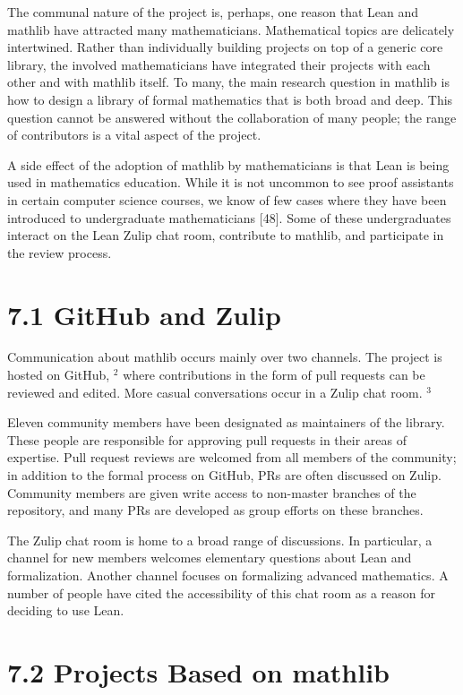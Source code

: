 \documentclass[
]{article}
\begin{document}
The communal nature of the project is, perhaps, one reason that Lean and
mathlib have attracted many mathematicians. Mathematical topics are
delicately intertwined. Rather than individually building projects on
top of a generic core library, the involved mathematicians have
integrated their projects with each other and with mathlib itself. To
many, the main research question in mathlib is how to design a library
of formal mathematics that is both broad and deep. This question cannot
be answered without the collaboration of many people; the range of
contributors is a vital aspect of the project.

A side effect of the adoption of mathlib by mathematicians is that Lean
is being used in mathematics education. While it is not uncommon to see
proof assistants in certain computer science courses, we know of few
cases where they have been introduced to undergraduate mathematicians
{[}48{]}. Some of these undergraduates interact on the Lean Zulip chat
room, contribute to mathlib, and participate in the review process.

\section{7.1 GitHub and Zulip}\label{github-and-zulip}

Communication about mathlib occurs mainly over two channels. The project
is hosted on GitHub, \(^{2}\) where contributions in the form of pull
requests can be reviewed and edited. More casual conversations occur in
a Zulip chat room. \(^{3}\)

Eleven community members have been designated as maintainers of the
library. These people are responsible for approving pull requests in
their areas of expertise. Pull request reviews are welcomed from all
members of the community; in addition to the formal process on GitHub,
PRs are often discussed on Zulip. Community members are given write
access to non-master branches of the repository, and many PRs are
developed as group efforts on these branches.

The Zulip chat room is home to a broad range of discussions. In
particular, a channel for new members welcomes elementary questions
about Lean and formalization. Another channel focuses on formalizing
advanced mathematics. A number of people have cited the accessibility of
this chat room as a reason for deciding to use Lean.

\section{7.2 Projects Based on mathlib}\label{projects-based-on-mathlib}
\end{document}
